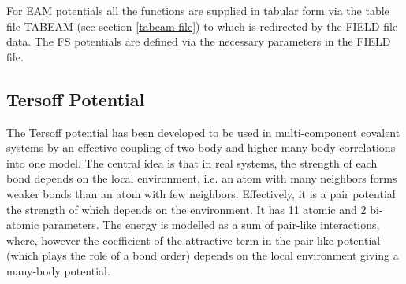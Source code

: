 For EAM potentials all the functions are supplied in tabular form via
the table file TABEAM (see section \ref{tabeam-file}) to which \D is
redirected by the FIELD file data.  The FS potentials are defined via
the necessary parameters in the FIELD file.

\subsection{Tersoff Potential}
\label{tersoff}

The Tersoff \cite{tersoff-89a} potential
has been developed to be used in multi-component covalent systems by
an effective coupling of two-body and higher many-body correlations
into one model.  The central idea is that in real systems, the
strength of each bond depends on the local environment, i.e. an atom
with many neighbors forms weaker bonds than an atom with few
neighbors.  Effectively, it is a pair potential the strength of
which depends on the environment.  It has 11 atomic and 2 bi-atomic
parameters.  The energy is modelled as a sum of pair-like
interactions, where, however the coefficient of the attractive term
in the pair-like potential (which plays the role of a bond order)
depends on the local environment giving a many-body potential.

